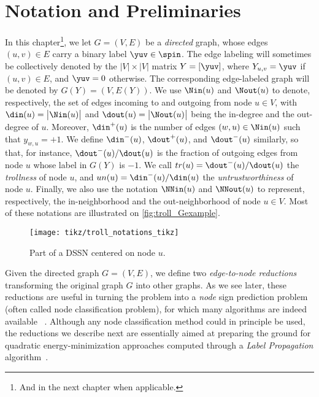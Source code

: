 \section{Notation and Preliminaries}\label{s:prel}

In this chapter\footnote{And in the next chapter when applicable.}, we let $G=(V,E)$ be a
\emph{directed} graph, whose edges $(u,v) \in E$ carry a
binary label $\yuv\in \spin$. The edge labeling will sometimes be collectively denoted by the
$|V|\times |V|$ matrix $Y = [\yuv]$, where $Y_{u,v} = \yuv$ if $(u,v) \in E$, and $\yuv = 0$
otherwise. The corresponding edge-labeled graph will be denoted by $G(Y) = (V,E(Y))$. We use
$\Nin(u)$ and $\Nout(u)$ to denote, respectively, the set of edges incoming to and outgoing from
node $u \in V$, with $\din(u) = \big|\Nin(u)\big|$ and $\dout(u) = \big|\Nout(u)\big|$ being the
in-degree and the out-degree of $u$. Moreover, $\din^+(u)$ is the number of edges $(w,u)\in\Nin(u)$
such that $y_{w,u} = +1$. We define $\din^-(u)$, $\dout^+(u)$, and $\dout^-(u)$ similarly, so that,
for instance, $\dout^-(u)/\dout(u)$ is the fraction of outgoing edges from node $u$ whose label in
$G(Y)$ is $-1$. We call $tr(u) = \dout^-(u)/\dout(u)$ the \emph{trollness} of node $u$, and $un(u)
= \din^-(u)/\din(u)$ the \emph{untrustworthiness} of node $u$. Finally, we also use the notation
$\NNin(u)$ and $\NNout(u)$ to represent, respectively, the in-neighborhood and the out-neighborhood
of node $u \in V$. Most of these notations are illustrated on \autoref{fig:troll_Gexample}.
\begin{figure}[hbpt]
  \centering
  \texttt{[image: tikz/troll\_notations\_tikz]}
  \caption{Part of a DSSN centered on node $u$. \label{fig:troll_Gexample}}
\end{figure}

Given the directed graph $G = (V,E)$, we define two \emph{edge-to-node reductions} transforming the
original graph $G$ into other graphs. As we see later, these reductions are useful in turning the
\esp{} problem into a \emph{node} sign prediction problem (often called node
classification problem), for which many algorithms are indeed available~%
\autocites{BC01}{LabelPropa03}{BDL06}{HP07}{HLP09}{Vitale2012}{HPV12}{WTA13}{HPG15}.  Although any
node classification method could in principle be used, the reductions we describe next are
essentially aimed at preparing the ground for quadratic energy-minimization approaches computed
through a \emph{Label Propagation} algorithm~\autocites{LabelPropa03}{BDL06}.

